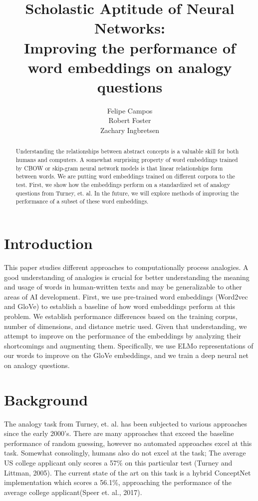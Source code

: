 \documentclass[11pt]{article}
\title{%
  Scholastic Aptitude of Neural Networks: \\
  \large Improving the performance of word embeddings on analogy questions
}
\author{Felipe Campos \\\And
  Robert Foster \\\And
  Zachary Ingbretsen \\
}
\date{}
\begin{document}
\maketitle
\begin{abstract}
Understanding the relationships between abstract concepts is a valuable skill for both humans and computers. A somewhat surprising property of word embeddings trained by CBOW or skip-gram neural network models is that linear relationships form between words. We are putting word embeddings trained on different corpora to the test. First, we show how the embeddings perform on a standardized set of analogy questions from Turney, et. al. In the future, we will explore methods of improving the performance of a subset of these word embeddings.\end{abstract}

\section{Introduction}

This paper studies different approaches to computationally process
analogies. A good understanding of analogies is crucial for better
understanding the meaning and usage of words in human-written texts and
may be generalizable to other areas of AI development. First, we use
pre-trained word embeddings (Word2vec and GloVe) to establish a baseline
of how word embeddings perform at this problem. We establish performance
differences based on the training corpus, number of dimensions, and
distance metric used. Given that understanding, we attempt to improve on
the performance of the embeddings by analyzing their shortcomings and
augmenting them. Specifically, we use ELMo representations of our words
to improve on the GloVe embeddings, and we train a deep neural net on
analogy questions.

\section{Background}

The analogy task from Turney, et. al. has been subjected to various
approaches since the early 2000's. There are many approaches that exceed
the baseline performance of random guessing, however no automated
approaches excel at this task. Somewhat consolingly, humans also do not
excel at the task; The average US college applicant only scores a 57\%
on this particular test (Turney and Littman, 2005). The current state of
the art on this task is a hybrid ConceptNet implementation which scores
a 56.1\%, approaching the performance of the average college
applicant(Speer et. al., 2017).
\end{document}

